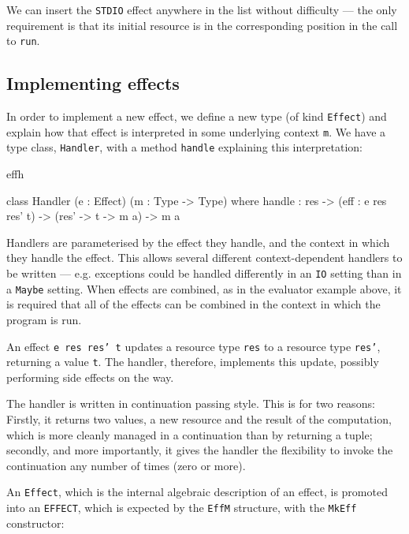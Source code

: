 \noindent
We can insert the \texttt{STDIO} effect anywhere in the list without difficulty
--- the only requirement is that its initial resource is in the corresponding
position in the call to \texttt{run}.

\subsection{Implementing effects}

In order to implement a new effect, we define a new type (of kind \texttt{Effect})
and explain how that effect is interpreted in some underlying context
\texttt{m}. We have a type class, \texttt{Handler}, with a method \texttt{handle}
explaining this interpretation:

\begin{SaveVerbatim}{effh}

class Handler (e : Effect) (m : Type -> Type) where
     handle : res -> (eff : e res res' t) -> 
              (res' -> t -> m a) -> m a

\end{SaveVerbatim}

\noindent
Handlers are parameterised by the effect they handle, and the context in which
they handle the effect. This allows several different context-dependent
handlers to be written --- e.g. exceptions could be handled differently in an
\texttt{IO} setting than in a \texttt{Maybe} setting. When effects are combined,
as in the evaluator example above, it is required that all of the effects
can be combined in the context in which the program is run.

An effect \texttt{e res res' t} updates a resource type \texttt{res} to a
resource type \texttt{res'}, returning a value \texttt{t}. The handler, therefore,
implements this update, possibly performing side effects on the way.

The handler is written in continuation passing style. This is for two reasons:
Firstly, it returns two values, a new resource and the result of the computation,
which is more cleanly managed in a continuation than by returning a tuple;
secondly, and more importantly, it gives the handler the flexibility to invoke
the continuation any number of times (zero or more).

An \texttt{Effect}, which is the internal algebraic description of an effect,
is promoted into an \texttt{EFFECT}, which is expected by the \texttt{EffM}
structure, with the \texttt{MkEff} constructor:

